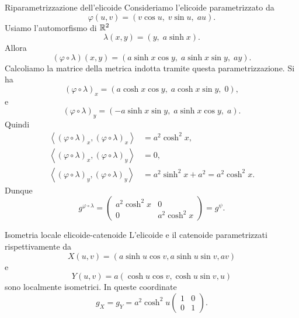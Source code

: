\documentclass[a4paper]{article}
\begin{document}
\begin{snippetexample}{Riparametrizzazione dell'elicoide}
Consideriamo l'elicoide parametrizzato da
\[
    \varphi(u,v)
    =
    (v\cos u,\;v\sin u,\;au).
\]
Usiamo l'automorfismo di \(\mathbb{R}^2\)
\[
    \lambda(x,y)=(y,\;a\sinh x).
\]
Allora
\[
    (\varphi\circ\lambda)(x,y)
    =
    (a\sinh x\cos y,\;a\sinh x\sin y,\;ay).
\]
Calcoliamo la matrice della metrica indotta tramite questa parametrizzazione. Si ha
\[
    (\varphi\circ\lambda)_x
    =
    (a\cosh x\cos y,\;a\cosh x\sin y,\;0),
\]
e
\[
    (\varphi\circ\lambda)_y
    =
    (-a\sinh x\sin y,\;a\sinh x\cos y,\;a).
\]
Quindi
\begin{align*}
    \left\langle
        (\varphi\circ\lambda)_x,
        (\varphi\circ\lambda)_x
    \right\rangle
    &=
    a^2\cosh^2x,\\
    \left\langle
        (\varphi\circ\lambda)_x,
        (\varphi\circ\lambda)_y
    \right\rangle
    &=
    0,\\
    \left\langle
        (\varphi\circ\lambda)_y,
        (\varphi\circ\lambda)_y
    \right\rangle
    &=
    a^2\sinh^2x+a^2
    =
    a^2\cosh^2x.
\end{align*}
Dunque
\[
    g^{\varphi\circ\lambda}
    =
    \begin{pmatrix}
        a^2\cosh^2x & 0\\
        0 & a^2\cosh^2x
    \end{pmatrix}
    =
    g^\psi.
\]
\end{snippetexample}

\begin{snippetproposition}{Isometria locale elicoide-catenoide}
    L'elicoide e il catenoide parametrizzati rispettivamente da
    \[
        X(u,v)=
        \left( a\sinh u\cos v, a\sinh u\sin v, av \right)
    \]
    e
    \[
        Y(u,v)=
        a\left( \cosh u\cos v, \cosh u\sin v, u \right)
    \]
    sono localmente isometrici. In queste coordinate
    \[
        g_X=g_Y=a^2\cosh^2 u
        \begin{pmatrix}
            1 & 0\\
            0 & 1
        \end{pmatrix}.
    \]
\end{snippetproposition}
\end{document}
